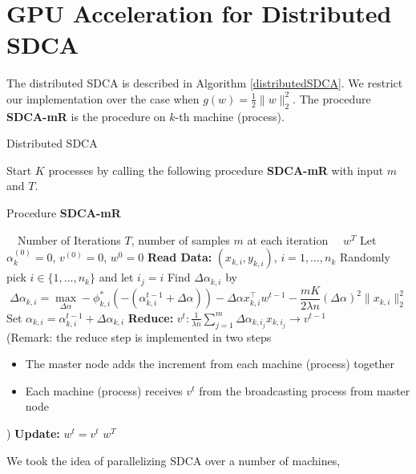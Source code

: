 \documentclass{article}
\begin{document}
\section{GPU Acceleration for Distributed SDCA}
The distributed SDCA \cite{yang2013trading} is described in Algorithm
\ref{distributedSDCA}. We restrict our implementation over the case when
$g(w)=\frac{1}{2}\|w\|_2^2$. The procedure \textbf{SDCA-mR} is the procedure on
$k$-th machine (process).

\begin{algorithm}[H]
	\caption{Distributed SDCA}
	\label{distributedSDCA}
	\begin{algorithmic}[1]
		\STATE	Start $K$ processes by calling the following procedure \textbf{SDCA-mR} with input $m$ and $T$.\\ 
		\begin{center}Procedure \textbf{SDCA-mR}
			\end{center}
		\REQUIRE~~Number of Iterations $T$, number of samples $m$ at each iteration
		\ENSURE~~$w^{T}$
	\STATE Let $\alpha_k^{(0)}=0$, $v^{(0)}=0$, $w^{0}=0$
	\STATE \textbf{Read Data:} $(x_{k,i},y_{k,i})$, $i=1,\ldots,n_k$
	\STATE Randomly pick $i\in\{1,\ldots,n_k\}$ and let $i_j=i$
	\STATE Find $\Delta\alpha_{k,i}$ by
	\begin{equation*}
		\Delta\alpha_{k,i}=\max_{\Delta\alpha}-\phi_{k,i}^*(-(\alpha_{k,i}^{t-1}+\Delta\alpha))-\Delta\alpha x_{k,i}^\top w^{t-1}-\frac{mK}{2\lambda n}(\Delta\alpha)^2\|x_{k,i}\|_2^2
	\end{equation*}
	\STATE Set $\alpha_{k,i}=\alpha_{k,i}^{t-1}+\Delta\alpha_{k,i}$
	\ENDFOR
	\STATE \textbf{Reduce:} $v^{t}:\frac{1}{\lambda n}\sum_{j=1}^{m}\Delta\alpha_{k,i_j}x_{k,i_j}\rightarrow v^{t-1}$\\ (Remark: the reduce step is implemented in two steps
	\begin{itemize}
		\item The master node adds the increment from each machine (process) together
		 \item Each machine (process) receives $v^t$ from the broadcasting process from master node 
		\end{itemize})
	\STATE \textbf{Update:} $w^t=v^t$
	\ENDFOR
	\RETURN $w^T$
	\end{algorithmic}
\end{algorithm}
We took the idea of parallelizing SDCA over a number of machines,
\end{document}
